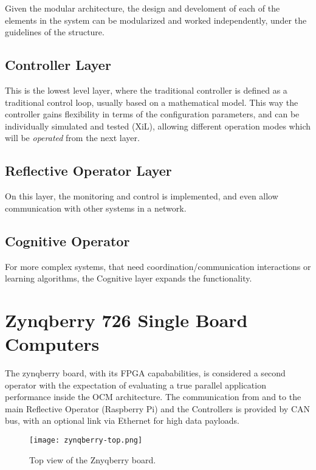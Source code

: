 Given the modular architecture, the design and develoment of each of the elements in the system can be modularized and worked independently, under the guidelines of the structure.

\subsection*{Controller Layer}

This is the lowest level layer, where the traditional controller is defined as a traditional control loop, usually based on a mathematical model. This way the controller gains flexibility in terms of the configuration parameters, and can be individually simulated and tested (XiL), allowing different operation modes which will be \textit{operated} from the next layer.

\subsection*{Reflective Operator Layer}

On this layer, the monitoring and control is implemented, and even allow communication with other systems in a network.

\subsection*{Cognitive Operator}

For more complex systems, that need coordination/communication interactions or learning algorithms, the Cognitive layer expands the functionality.

\section{Zynqberry 726 Single Board Computers}

The zynqberry board, with its FPGA capababilities, is considered a second operator with the expectation of evaluating a true parallel application performance inside the OCM architecture. The communication from and to the main Reflective Operator (Raspberry Pi) and the Controllers is provided by CAN bus, with an optional link via Ethernet for high data payloads.

\begin{figure}[htp]
	\centering
	\texttt{[image: zynqberry-top.png]}
	\caption{Top view of the Znyqberry board.} \label{fig:znyqtop}
\end{figure}

